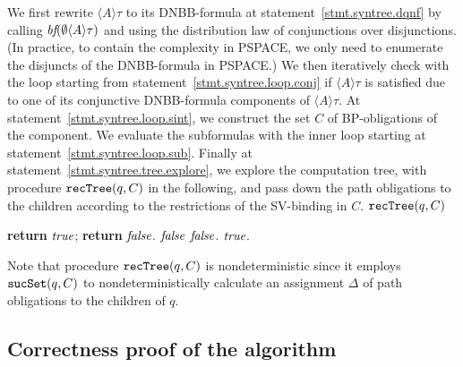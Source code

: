\procend
We first rewrite $\langle A\rangle\tau$ 
to its DNBB-formula at statement~\ref{stmt.syntree.dqnf} by 
calling $\textit{bf}(\emptyset\langle A\rangle\tau)$ and 
using the distribution law of conjunctions over disjunctions. 
(In practice, to contain the complexity in PSPACE, 
we only need to enumerate the disjuncts of 
the DNBB-formula in PSPACE.)  
We then iteratively check
with the loop starting from statement~\ref{stmt.syntree.loop.conj}
if $\langle A\rangle\tau$ is satisfied 
due to one of its conjunctive DNBB-formula components of 
$\langle A\rangle\tau$.
At statement~\ref{stmt.syntree.loop.sint},
we construct the set $C$ of BP-obligations of the component.  
We evaluate the subformulas with the inner loop 
starting at statement~\ref{stmt.syntree.loop.sub}.  
Finally at statement~\ref{stmt.syntree.tree.explore},
we explore the computation tree, 
with procedure $\mbox{\tt recTree}(q,C)$ in the following, 
and pass down the path obligations
to the children according to the restrictions of the 
SV-binding in $C$.
\procbegin
$\mbox{\tt recTree}(q,C)$
\begin{algorithmic}[1]
  \label{stmt.recsyn.until} 
    \textbf{return} $\mbox{\em true}$;
  \ELSELINE
    \textbf{return} $\mbox{\em false}$.
  \ENDIFLINE
\ENDIF
{} \RETLINE $\mbox{\em false}$ \ENDIFLINE
{}
    \RETLINE $\mbox{\em false}$.
  \ENDIFLINE
\ENDFOR 
\RETURN $\mbox{\em true}$.
\end{algorithmic}
\procend
Note that procedure $\mbox{\tt recTree}(q,C)$ is nondeterministic
since it employs \linebreak 
$\mbox{\tt sucSet}(q,C)$
to nondeterministically calculate an assignment $\Delta$ of
path obligations to the children of $q$.


\subsection{Correctness proof of the algorithm
\label{subsec.alg.corr}
}

